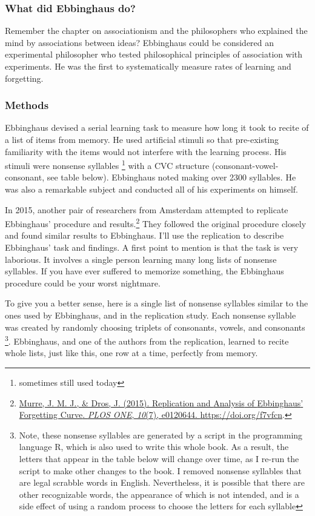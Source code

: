 \documentclass[
  oneside,
  12pt]{crumpbook}
\begin{document}
\hypertarget{what-did-ebbinghaus-do}{%
\subsubsection{What did Ebbinghaus do?}\label{what-did-ebbinghaus-do}}

Remember the chapter on associationism and the philosophers who explained the mind by associations between ideas? Ebbinghaus could be considered an experimental philosopher who tested philosophical principles of association with experiments. He was the first to systematically measure rates of learning and forgetting.

\hypertarget{methods-1}{%
\subsubsection{Methods}\label{methods-1}}

Ebbinghaus devised a serial learning task to measure how long it took to recite of a list of items from memory. He used artificial stimuli so that pre-existing familiarity with the items would not interfere with the learning process. His stimuli were nonsense syllables \footnote{sometimes still used today} with a CVC structure (consonant-vowel-consonant, see table below). Ebbinghaus noted making over 2300 syllables. He was also a remarkable subject and conducted all of his experiments on himself.

In 2015, another pair of researchers from Amsterdam attempted to replicate Ebbinghaus' procedure and results.\footnote{\protect\hyperlink{ref-murreReplicationAnalysisEbbinghaus2015}{Murre, J. M. J., \& Dros, J. (2015). Replication and {Analysis} of {Ebbinghaus}' {Forgetting Curve}. \emph{PLOS ONE}, \emph{10}(7), e0120644. \url{https://doi.org/f7vfcn}}.} They followed the original procedure closely and found similar results to Ebbinghaus. I'll use the replication to describe Ebbinghaus' task and findings. A first point to mention is that the task is very laborious. It involves a single person learning many long lists of nonsense syllables. If you have ever suffered to memorize something, the Ebbinghaus procedure could be your worst nightmare.

To give you a better sense, here is a single list of nonsense syllables similar to the ones used by Ebbinghaus, and in the replication study. Each nonsense syllable was created by randomly choosing triplets of consonants, vowels, and consonants \footnote{Note, these nonsense syllables are generated by a script
  in the programming language R, which is also used to write this
  whole book. As a result, the letters that appear in the table below
  will change over time, as I re-run the script to make other changes
  to the book. I removed nonsense syllables that are legal scrabble
  words in English. Nevertheless, it is possible that there are other
  recognizable words, the appearance of which is not intended, and is
  a side effect of using a random process to choose the letters for
  each syllable}. Ebbinghaus, and one of the authors from the replication, learned to recite whole lists, just like this, one row at a time, perfectly from memory.
\end{document}
